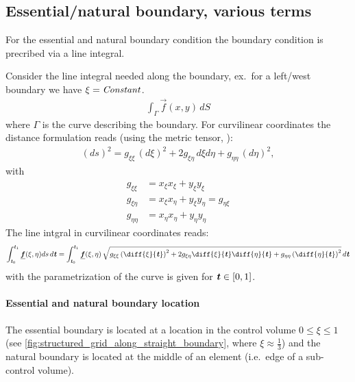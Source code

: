 \subsection{Essential/natural boundary, various terms}

For the essential and natural boundary condition the boundary condition is precribed via a line integral.

Consider the line integral needed along the boundary, ex.\ for a left/west boundary we have $\xi = \it{Constant}$.
\begin{align}
    \int_\Gamma \vec{f}(x,y) \, dS
\end{align}
where $\Gamma$ is the curve describing the boundary.
For curvilinear coordinates the distance formulation reads (using the metric tensor, \citet{Aris1962}):
\begin{align}
    (ds)^2 = g_{\xi\xi}\,(d\xi)^2 + 2 g_{\xi\eta}\,d\xi d\eta + g_{\eta \eta}\, (d\eta)^2,
\end{align}
with
\begin{align}
g_{\xi\xi} &= x_\xi x_\xi + y_\xi y_\xi \\
g_{\xi\eta} & = x_\xi x_\eta  + y_\xi y_\eta = g_{\eta\xi} \\
g_{\eta\eta} &= x_\eta x_\eta  + y_\eta y_\eta
\end{align}
The line intgral in curvilinear coordinates reads:
\begin{align}
    \int^{\paramt_1}_{\paramt_0}  \vec{f}(\xi,\eta) ds \, d\paramt  = \int^{\paramt_1}_{\paramt_0} \vec{f}(\xi,\eta) \, \sqrt{ g_{\xi\xi} \left(\diff{\xi}{\paramt}\right)^2
        + 2g_{\xi\eta} \diff{\xi}{\paramt} \diff{\eta}{\paramt}
        + g_{\eta\eta} \left(\diff{\eta}{\paramt}\right)^2 } \, d\paramt
\end{align}
with the parametrization of the curve is given for $\textbf{\textit{t}} \in [0,1]$.

\paragraph*{Essential and natural boundary location}
The essential boundary is located at a location in the control volume $0\leq\xi\leq 1$ (see \autoref{fig:structured_grid_along_straight_boundary}, where $\xi \approx \frac{1}{3}$) and the natural boundary is located at the middle of an element (i.e.\ edge of a sub-control volume).

